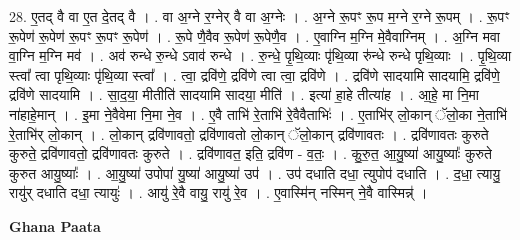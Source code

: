 \documentclass[17pt]{extarticle}
\begin{document}
28. ए॒तद् वै वा ए॒त दे॒तद् वै । . वा अ॒ग्ने र॒ग्नेर् वै वा अ॒ग्नेः । . अ॒ग्ने रू॒पꣳ रू॒प म॒ग्ने र॒ग्ने रू॒पम् । . रू॒पꣳ रू॒पेण॑ रू॒पेण॑ रू॒पꣳ रू॒पꣳ रू॒पेण॑ । . रू॒पे णै॒वैव रू॒पेण॑ रू॒पेणै॒व । . ए॒वाग्नि म॒ग्नि मे॒वैवाग्निम् । . अ॒ग्नि मवा वा॒ग्नि म॒ग्नि मव॑ । . अव॑ रुन्धे रु॒न्धे ऽवाव॑ रुन्धे । . रु॒न्धे॒ पृ॒थि॒व्याः पृ॑थि॒व्या रु॑न्धे रुन्धे पृथि॒व्याः । . पृ॒थि॒व्या स्त्वा᳚ त्वा पृथि॒व्याः पृ॑थि॒व्या स्त्वा᳚ । . त्वा॒ द्रवि॑णे॒ द्रवि॑णे त्वा त्वा॒ द्रवि॑णे । . द्रवि॑णे सादयामि सादयामि॒ द्रवि॑णे॒ द्रवि॑णे सादयामि । . सा॒द॒या॒ मीतीति॑ सादयामि सादया॒ मीति॑ । . इत्या॑ हा॒हे तीत्या॑ह । . आ॒हे॒ मा नि॒मा ना॑हाहे॒मान् । . इ॒मा ने॒वैवेमा नि॒मा ने॒व । . ए॒वै ताभि॑ रे॒ताभि॑ रे॒वैवैताभिः॑ । . ए॒ताभि॑र् लो॒कान् ॅलो॒का ने॒ताभि॑ रे॒ताभि॑र् लो॒कान् । . लो॒कान् द्रवि॑णावतो॒ द्रवि॑णावतो लो॒कान् ॅलो॒कान् द्रवि॑णावतः । . द्रवि॑णावतः कुरुते कुरुते॒ द्रवि॑णावतो॒ द्रवि॑णावतः कुरुते । . द्रवि॑णावत॒ इति॒ द्रवि॑ण - व॒तः॒ । . कु॒रु॒त॒ आ॒यु॒ष्या॑ आयु॒ष्याः᳚ कुरुते कुरुत आयु॒ष्याः᳚ । . आ॒यु॒ष्या॑ उपोपा॑ यु॒ष्या॑ आयु॒ष्या॑ उप॑ । . उप॑ दधाति दधा॒ त्युपोप॑ दधाति । . द॒धा॒ त्यायु॒ रायु॑र् दधाति दधा॒ त्यायुः॑ । . आयु॑ रे॒वै वायु॒ रायु॑ रे॒व । . ए॒वास्मि॑न् नस्मिन् ने॒वै वास्मिन्न्॑ । \newline

\textbf{Ghana Paata } \newline
\end{document}
